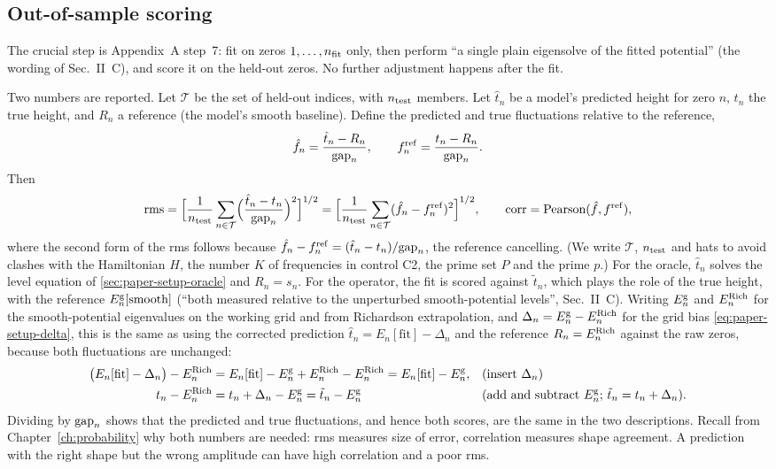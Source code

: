 \subsection{Out-of-sample scoring}

The crucial step is Appendix~A step~7: fit on zeros $1,\dots,n_{\rm fit}$ only, then perform ``a single plain eigensolve of the fitted potential'' (the wording of Sec.~II~C), and score it on the held-out zeros. No further adjustment happens after the fit.

Two numbers are reported. Let $\mathcal T$ be the set of held-out indices, with $n_{\rm test}$ members. Let $\hat t_n$ be a model's predicted height for zero $n$, $t_n$ the true height, and $R_n$ a reference (the model's smooth baseline). Define the predicted and true fluctuations relative to the reference,
\begin{equation}
\hat f_n=\frac{\hat t_n-R_n}{\mathrm{gap}_n},\qquad f^{\rm ref}_n=\frac{t_n-R_n}{\mathrm{gap}_n}.
\label{eq:paper-setup-pq}
\end{equation}
Then
\begin{equation}
\mathrm{rms}=\Bigl[\frac{1}{n_{\rm test}}\sum_{n\in\mathcal T}\Bigl(\frac{\hat t_n-t_n}{\mathrm{gap}_n}\Bigr)^2\Bigr]^{1/2}=\Bigl[\frac{1}{n_{\rm test}}\sum_{n\in\mathcal T}(\hat f_n-f^{\rm ref}_n)^2\Bigr]^{1/2},
\qquad
\mathrm{corr}=\text{Pearson}(\hat f,f^{\rm ref}),
\label{eq:paper-setup-score}
\end{equation}
where the second form of the rms follows because $\hat f_n-f^{\rm ref}_n=(\hat t_n-t_n)/\mathrm{gap}_n$, the reference cancelling. (We write $\mathcal T$, $n_{\rm test}$ and hats to avoid clashes with the Hamiltonian $H$, the number $K$ of frequencies in control C2, the prime set $P$ and the prime $p$.) For the oracle, $\hat t_n$ solves the level equation of \cref{sec:paper-setup-oracle} and $R_n=s_n$. For the operator, the fit is scored against $\tilde t_n$, which plays the role of the true height, with the reference $E_n^{\rm g}[\text{smooth}]$ (``both measured relative to the unperturbed smooth-potential levels'', Sec.~II~C). Writing $E^{\rm g}_n$ and $E^{\rm Rich}_n$ for the smooth-potential eigenvalues on the working grid and from Richardson extrapolation, and $\Delta_n=E^{\rm g}_n-E^{\rm Rich}_n$ for the grid bias \eqref{eq:paper-setup-delta}, this is the same as using the corrected prediction $\hat t_n=E_n[\text{fit}]-\Delta_n$ and the reference $R_n=E^{\rm Rich}_n$ against the raw zeros, because both fluctuations are unchanged:
\begin{align}
\bigl(E_n[\text{fit}]-\Delta_n\bigr)-E^{\rm Rich}_n
&=E_n[\text{fit}]-E^{\rm g}_n+E^{\rm Rich}_n-E^{\rm Rich}_n=E_n[\text{fit}]-E^{\rm g}_n,
&&\text{(insert $\Delta_n$)}\nonumber\\
t_n-E^{\rm Rich}_n
&=t_n+\Delta_n-E^{\rm g}_n=\tilde t_n-E^{\rm g}_n
&&\text{(add and subtract $E^{\rm g}_n$; $\tilde t_n=t_n+\Delta_n$)}.\nonumber
\end{align}
Dividing by $\mathrm{gap}_n$ shows that the predicted and true fluctuations, and hence both scores, are the same in the two descriptions. Recall from Chapter~\ref{ch:probability} why both numbers are needed: rms measures size of error, correlation measures shape agreement. A prediction with the right shape but the wrong amplitude can have high correlation and a poor rms.


